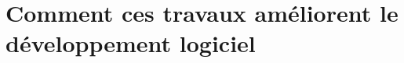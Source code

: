 \chapter{Comment ces travaux améliorent le développement logiciel}
    \section{}
        \subsection{}
            \subsubsection{}